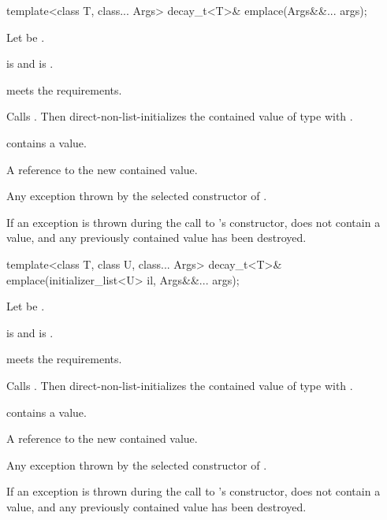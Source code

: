 %
\begin{itemdecl}
template<class T, class... Args>
  decay_t<T>& emplace(Args&&... args);
\end{itemdecl}

\begin{itemdescr}
\pnum
Let  be .

\pnum
\constraints
{} is  and
 is .

\pnum
\expects
{} meets the  requirements.

\pnum
\effects
Calls .
Then direct-non-list-initializes the contained value of type 
with .

\pnum
\ensures
{} contains a value.

\pnum
\returns
A reference to the new contained value.

\pnum
\throws
Any exception thrown by the selected constructor of .

\pnum
\remarks
If an exception is thrown during the call to 's constructor,
 does not contain a value, and any previously contained value
has been destroyed.
\end{itemdescr}

%
\begin{itemdecl}
template<class T, class U, class... Args>
  decay_t<T>& emplace(initializer_list<U> il, Args&&... args);
\end{itemdecl}

\begin{itemdescr}
\pnum
Let  be .

\pnum
\constraints
{} is  and
 is .

\pnum
\expects
{} meets the  requirements.

\pnum
\effects
Calls . Then direct-non-list-initializes the contained value
of type  with .

\pnum
\ensures
{} contains a value.

\pnum
\returns
A reference to the new contained value.

\pnum
\throws
Any exception thrown by the selected constructor of .

\pnum
\remarks
If an exception is thrown during the call to 's constructor,
 does not contain a value, and any previously contained value
has been destroyed.
\end{itemdescr}

